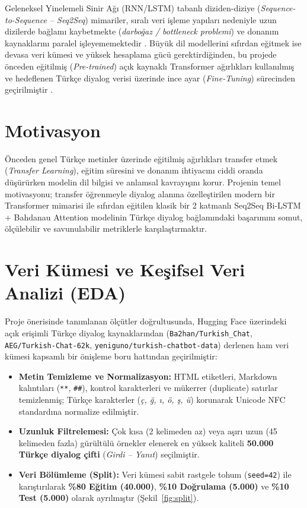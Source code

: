 \documentclass[conference]{IEEEtran}
\begin{document}
Geleneksel Yinelemeli Sinir Ağı (RNN/LSTM) tabanlı diziden-diziye (\textit{Sequence-to-Sequence -- Seq2Seq}) mimariler, sıralı veri işleme yapıları nedeniyle uzun dizilerde bağlamı kaybetmekte (\textit{darboğaz / bottleneck problemi}) ve donanım kaynaklarını paralel işleyememektedir \cite{bahdanau2014}. Büyük dil modellerini sıfırdan eğitmek ise devasa veri kümesi ve yüksek hesaplama gücü gerektirdiğinden, bu projede önceden eğitilmiş (\textit{Pre-trained}) açık kaynaklı Transformer ağırlıkları kullanılmış ve hedeflenen Türkçe diyalog verisi üzerinde ince ayar (\textit{Fine-Tuning}) sürecinden geçirilmiştir \cite{vaswani2017, radford2019}.

\section{Motivasyon}
Önceden genel Türkçe metinler üzerinde eğitilmiş ağırlıkları transfer etmek (\textit{Transfer Learning}), eğitim süresini ve donanım ihtiyacını ciddi oranda düşürürken modelin dil bilgisi ve anlamsal kavrayışını korur. Projenin temel motivasyonu; transfer öğrenmeyle diyalog alanına özelleştirilen modern bir Transformer mimarisi ile sıfırdan eğitilen klasik bir 2 katmanlı Seq2Seq Bi-LSTM + Bahdanau Attention modelinin Türkçe diyalog bağlamındaki başarımını somut, ölçülebilir ve savunulabilir metriklerle karşılaştırmaktır.

\section{Veri Kümesi ve Keşifsel Veri Analizi (EDA)}
Proje önerisinde tanımlanan ölçütler doğrultusunda, Hugging Face üzerindeki açık erişimli Türkçe diyalog kaynaklarından (\texttt{Ba2han/Turkish\_Chat}, \texttt{AEG/Turkish-Chat-62k}, \texttt{yeniguno/turkish-chatbot-data}) derlenen ham veri kümesi kapsamlı bir önişleme boru hattından geçirilmiştir:
\begin{itemize}
    \item \textbf{Metin Temizleme ve Normalizasyon:} HTML etiketleri, Markdown kalıntıları (\texttt{**}, \texttt{\#\#}), kontrol karakterleri ve mükerrer (duplicate) satırlar temizlenmiş; Türkçe karakterler (\textit{ç, ğ, ı, ö, ş, ü}) korunarak Unicode NFC standardına normalize edilmiştir.
    \item \textbf{Uzunluk Filtrelemesi:} Çok kısa (2 kelimeden az) veya aşırı uzun (45 kelimeden fazla) gürültülü örnekler elenerek en yüksek kaliteli \textbf{50.000 Türkçe diyalog çifti} (\textit{Girdi -- Yanıt}) seçilmiştir.
    \item \textbf{Veri Bölümleme (Split):} Veri kümesi sabit rastgele tohum (\texttt{seed=42}) ile karıştırılarak \textbf{\%80 Eğitim (40.000)}, \textbf{\%10 Doğrulama (5.000)} ve \textbf{\%10 Test (5.000)} olarak ayrılmıştır (Şekil~\ref{fig:split}).
\end{itemize}
\end{document}
